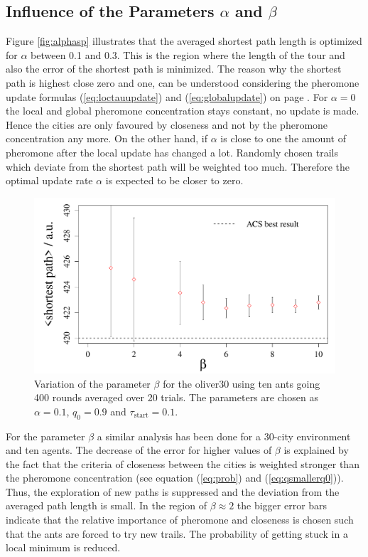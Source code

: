\subsection{Influence of the Parameters $\alpha$ and $\beta$}

\noindent Figure \ref{fig:alphasp} illustrates that the averaged shortest path length is optimized for $\alpha$ between 0.1 and 0.3. This is the region where the length of the tour and also the error of the shortest path is minimized. The reason why the shortest path is highest close zero and one, can be understood considering the pheromone update formulas (\ref{eq:loctauupdate}) and (\ref{eq:globalupdate}) on page \pageref{eq:globalupdate}. For $\alpha=0$ the local and global pheromone concentration stays constant, no update is made. Hence the cities are only favoured by closeness and not by the pheromone concentration any more. On the other hand, if $\alpha$ is close to one the amount of pheromone after the local update has changed a lot. Randomly chosen trails which deviate from the shortest path will be weighted too much. Therefore the optimal update rate $\alpha$ is expected to be closer to zero. 

\begin{figure}[H]
\begin{center}
\includegraphics[width=0.8\linewidth]{beta_vs_shortestpath}
\caption{Variation of the parameter $\beta$ for the oliver30 using ten ants going 400 rounds averaged over 20 trials. The parameters are chosen as $\alpha=0.1$, $q_0=0.9$ and $\tau_{\text{start}}=0.1$.}
\label{fig:betasp}
\end{center}
\end{figure}
\noindent For the parameter $\beta$ a similar analysis has been done for a 30-city environment and ten agents. The decrease of the error for higher values of $\beta$ is explained by the fact that the criteria of closeness between the cities is weighted stronger than the pheromone concentration (see equation (\ref{eq:prob}) and (\ref{eq:qsmallerq0})). Thus, the exploration of new paths is suppressed and the deviation from the averaged path length is small. In the region of $\beta\approx2$ the bigger error bars indicate that the relative importance of pheromone and closeness is chosen such that the ants are forced to try new trails. The probability of getting stuck in a local minimum is reduced.


